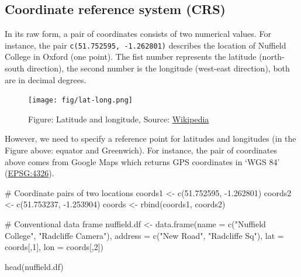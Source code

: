 \documentclass[
  letterpaper,
  DIV=11,
  numbers=noendperiod]{scrreprt}
\newenvironment{Shaded}{\begin{snugshade}}{\end{snugshade}}
\newcommand{\AttributeTok}[1]{\textcolor[rgb]{0.40,0.45,0.13}{#1}}
\newcommand{\CommentTok}[1]{\textcolor[rgb]{0.37,0.37,0.37}{#1}}
\newcommand{\DecValTok}[1]{\textcolor[rgb]{0.68,0.00,0.00}{#1}}
\newcommand{\FloatTok}[1]{\textcolor[rgb]{0.68,0.00,0.00}{#1}}
\newcommand{\FunctionTok}[1]{\textcolor[rgb]{0.28,0.35,0.67}{#1}}
\newcommand{\NormalTok}[1]{\textcolor[rgb]{0.00,0.23,0.31}{#1}}
\newcommand{\OtherTok}[1]{\textcolor[rgb]{0.00,0.23,0.31}{#1}}
\newcommand{\SpecialCharTok}[1]{\textcolor[rgb]{0.37,0.37,0.37}{#1}}
\newcommand{\StringTok}[1]{\textcolor[rgb]{0.13,0.47,0.30}{#1}}
\begin{document}
\hypertarget{coordinate-reference-system-crs}{%
\subsection{Coordinate reference system
(CRS)}\label{coordinate-reference-system-crs}}

In its raw form, a pair of coordinates consists of two numerical values.
For instance, the pair \texttt{c(51.752595,\ -1.262801)} describes the
location of Nuffield College in Oxford (one point). The fist number
represents the latitude (north-south direction), the second number is
the longitude (west-east direction), both are in decimal degrees.

\begin{figure}

{\centering \texttt{[image: fig/lat-long.png]}

}

\caption{Figure: Latitude and longitude, Source:
\href{https://en.wikipedia.org/wiki/Geographic_coordinate_system}{Wikipedia}}

\end{figure}

However, we need to specify a reference point for latitudes and
longitudes (in the Figure above: equator and Greenwich). For instance,
the pair of coordinates above comes from Google Maps which returns GPS
coordinates in `WGS 84' (\href{https://epsg.io/4326}{EPSG:4326}).

\begin{Shaded}
\begin{Highlighting}[]
\CommentTok{\# Coordinate pairs of two locations}
\NormalTok{coords1 }\OtherTok{\textless{}{-}} \FunctionTok{c}\NormalTok{(}\FloatTok{51.752595}\NormalTok{, }\SpecialCharTok{{-}}\FloatTok{1.262801}\NormalTok{)}
\NormalTok{coords2 }\OtherTok{\textless{}{-}} \FunctionTok{c}\NormalTok{(}\FloatTok{51.753237}\NormalTok{, }\SpecialCharTok{{-}}\FloatTok{1.253904}\NormalTok{)}
\NormalTok{coords }\OtherTok{\textless{}{-}} \FunctionTok{rbind}\NormalTok{(coords1, coords2)}

\CommentTok{\# Conventional data frame}
\NormalTok{nuffield.df }\OtherTok{\textless{}{-}} \FunctionTok{data.frame}\NormalTok{(}\AttributeTok{name =} \FunctionTok{c}\NormalTok{(}\StringTok{"Nuffield College"}\NormalTok{, }\StringTok{"Radcliffe Camera"}\NormalTok{),}
                          \AttributeTok{address =} \FunctionTok{c}\NormalTok{(}\StringTok{"New Road"}\NormalTok{, }\StringTok{"Radcliffe Sq"}\NormalTok{),}
                          \AttributeTok{lat =}\NormalTok{ coords[,}\DecValTok{1}\NormalTok{], }\AttributeTok{lon =}\NormalTok{ coords[,}\DecValTok{2}\NormalTok{])}

\FunctionTok{head}\NormalTok{(nuffield.df)}
\end{Highlighting}
\end{Shaded}
\end{document}
